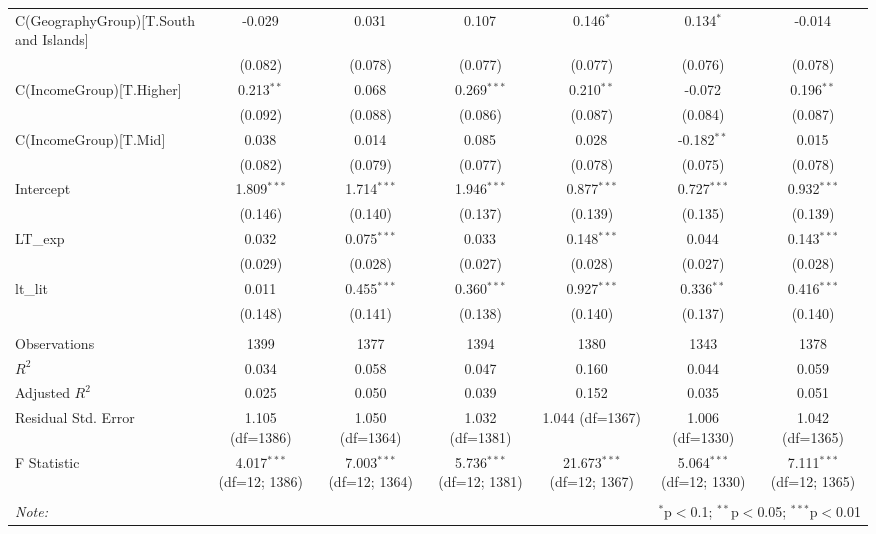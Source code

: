 \begin{table}[!htbp]
\begin{tabular}{@{\extracolsep{5pt}}lcccccc}
 C(GeographyGroup)[T.South and Islands] & -0.029$^{}$ & 0.031$^{}$ & 0.107$^{}$ & 0.146$^{*}$ & 0.134$^{*}$ & -0.014$^{}$ \\
& (0.082) & (0.078) & (0.077) & (0.077) & (0.076) & (0.078) \\
 C(IncomeGroup)[T.Higher] & 0.213$^{**}$ & 0.068$^{}$ & 0.269$^{***}$ & 0.210$^{**}$ & -0.072$^{}$ & 0.196$^{**}$ \\
& (0.092) & (0.088) & (0.086) & (0.087) & (0.084) & (0.087) \\
 C(IncomeGroup)[T.Mid] & 0.038$^{}$ & 0.014$^{}$ & 0.085$^{}$ & 0.028$^{}$ & -0.182$^{**}$ & 0.015$^{}$ \\
& (0.082) & (0.079) & (0.077) & (0.078) & (0.075) & (0.078) \\
 Intercept & 1.809$^{***}$ & 1.714$^{***}$ & 1.946$^{***}$ & 0.877$^{***}$ & 0.727$^{***}$ & 0.932$^{***}$ \\
& (0.146) & (0.140) & (0.137) & (0.139) & (0.135) & (0.139) \\
 LT_exp & 0.032$^{}$ & 0.075$^{***}$ & 0.033$^{}$ & 0.148$^{***}$ & 0.044$^{}$ & 0.143$^{***}$ \\
& (0.029) & (0.028) & (0.027) & (0.028) & (0.027) & (0.028) \\
 lt_lit & 0.011$^{}$ & 0.455$^{***}$ & 0.360$^{***}$ & 0.927$^{***}$ & 0.336$^{**}$ & 0.416$^{***}$ \\
& (0.148) & (0.141) & (0.138) & (0.140) & (0.137) & (0.140) \\
\hline \\[-1.8ex]
 Observations & 1399 & 1377 & 1394 & 1380 & 1343 & 1378 \\
 $R^2$ & 0.034 & 0.058 & 0.047 & 0.160 & 0.044 & 0.059 \\
 Adjusted $R^2$ & 0.025 & 0.050 & 0.039 & 0.152 & 0.035 & 0.051 \\
 Residual Std. Error & 1.105 (df=1386) & 1.050 (df=1364) & 1.032 (df=1381) & 1.044 (df=1367) & 1.006 (df=1330) & 1.042 (df=1365) \\
 F Statistic & 4.017$^{***}$ (df=12; 1386) & 7.003$^{***}$ (df=12; 1364) & 5.736$^{***}$ (df=12; 1381) & 21.673$^{***}$ (df=12; 1367) & 5.064$^{***}$ (df=12; 1330) & 7.111$^{***}$ (df=12; 1365) \\
\hline
\hline \\[-1.8ex]
\textit{Note:} & \multicolumn{6}{r}{$^{*}$p$<$0.1; $^{**}$p$<$0.05; $^{***}$p$<$0.01} \\
\end{tabular}
\end{table}